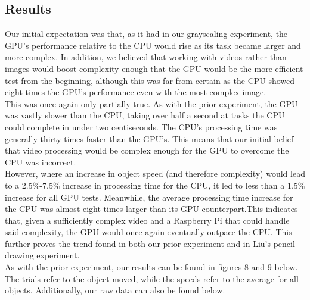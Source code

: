 \documentclass[conference]{IEEEtran}
\begin{document}
\subsection{Results}
Our initial expectation was that, as it had in our grayscaling experiment, the GPU's performance relative to the CPU would rise as its task became larger and more complex. In addition, we believed that working with videos rather than images would boost complexity enough that the GPU would be the more efficient test from the beginning, although this was far from certain as the CPU showed eight times the GPU's performance even with the most complex image.\\
This was once again only partially true. As with the prior experiment, the GPU was vastly slower than the CPU, taking over half a second at tasks the CPU could complete in under two centiseconds. The CPU's processing time was generally thirty times faster than the GPU's. This means that our initial belief that video processing would be complex enough for the GPU to overcome the CPU was incorrect.\\ 
However, where an increase in object speed (and therefore complexity) would lead to a 2.5\%-7.5\% increase in processing time for the CPU, it led to less than a 1.5\% increase for all GPU tests. Meanwhile, the average processing time increase for the CPU was almost eight times larger than its GPU counterpart.This indicates that, given a sufficiently complex video and a Raspberry Pi that could handle said complexity, the GPU would once again eventually outpace the CPU. This further proves the trend found in both our prior experiment and in Liu's pencil drawing experiment.\\
As with the prior experiment, our results can be found in figures 8 and 9 below. The trials refer to the object moved, while the speeds refer to the average for all objects. Additionally, our raw data can also be found below.\\

\begin{multicols}{2}
\begin{alltt}
{\footnotesize }
{\footnotesize }
\end{alltt}
\end{multicols}
\end{document}
